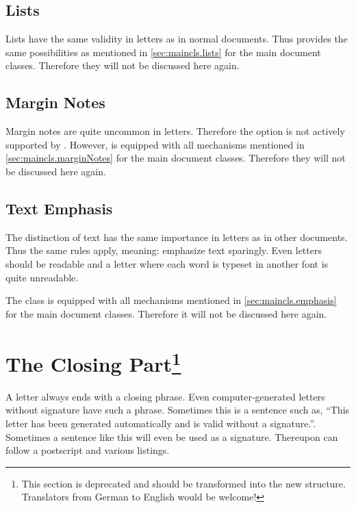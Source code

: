 \subsection{Lists}
\label{sec:scrlttr2.lists}

Lists have the same validity in letters as in normal documents.  Thus
 provides the same possibilities as mentioned in
\autoref{sec:maincls.lists} for the main document classes. Therefore
they will not be discussed here again.

\subsection{Margin Notes}
\label{sec:scrlttr2.marginNotes}

Margin notes are quite uncommon in letters. Therefore the option
 is not actively supported by .
However,  is equipped with all mechanisms mentioned in
\autoref{sec:maincls.marginNotes} for the main document
classes. Therefore they will not be discussed here again.

\subsection{Text Emphasis}
\label{sec:scrlttr2.emphasis}

The distinction of text has the same importance in letters as in other
documents. Thus the same rules apply, meaning: emphasize text
sparingly. Even letters should be readable and a letter where each
word is typeset in another font is quite unreadable.

The class  is equipped with all
mechanisms mentioned in \autoref{sec:maincls.emphasis} for
the main document classes. Therefore it will not be discussed
here again.

\section{The Closing Part\protect\footnote{This section is
  deprecated and should be transformed into the new structure. Translators
  from German to English would be welcome!}}
\label{sec:scrlttr2.backend}

A letter always ends with a closing phrase.  Even computer-generated
letters without signature have such a phrase.  Sometimes this is a
sentence such as, ``This letter has been generated automatically and
is valid without a signature.''.  Sometimes a sentence like this will
even be used as a signature.  Thereupon can follow a postscript and
various listings.

